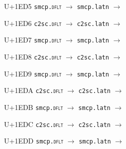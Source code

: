 \documentclass{article}
\begin{document}
\begin{substitutions}
\goodbreak

U+1ED5  \linebreak
    \texttt{smcp.\textsc{dflt}} $\to$  \linebreak
    \texttt{smcp.latn} $\to$  

\goodbreak

U+1ED6  \linebreak
    \texttt{c2sc.\textsc{dflt}} $\to$  \linebreak
    \texttt{c2sc.latn} $\to$  

\goodbreak

U+1ED7  \linebreak
    \texttt{smcp.\textsc{dflt}} $\to$  \linebreak
    \texttt{smcp.latn} $\to$  

\goodbreak

U+1ED8  \linebreak
    \texttt{c2sc.\textsc{dflt}} $\to$  \linebreak
    \texttt{c2sc.latn} $\to$  

\goodbreak

U+1ED9  \linebreak
    \texttt{smcp.\textsc{dflt}} $\to$  \linebreak
    \texttt{smcp.latn} $\to$  

\goodbreak

U+1EDA  \linebreak
    \texttt{c2sc.\textsc{dflt}} $\to$  \linebreak
    \texttt{c2sc.latn} $\to$  

\goodbreak

U+1EDB  \linebreak
    \texttt{smcp.\textsc{dflt}} $\to$  \linebreak
    \texttt{smcp.latn} $\to$  

\goodbreak

U+1EDC  \linebreak
    \texttt{c2sc.\textsc{dflt}} $\to$  \linebreak
    \texttt{c2sc.latn} $\to$  

\goodbreak

U+1EDD  \linebreak
    \texttt{smcp.\textsc{dflt}} $\to$  \linebreak
    \texttt{smcp.latn} $\to$  


\end{substitutions}
\end{document}
